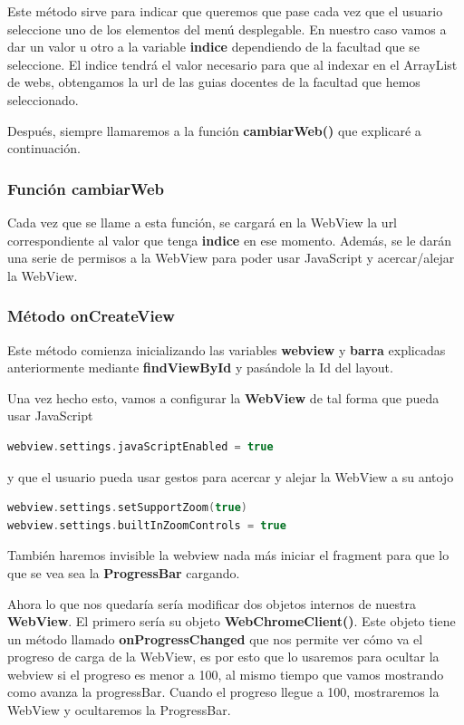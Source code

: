 Este método sirve para indicar que queremos que pase cada vez que el usuario seleccione uno de los elementos del menú desplegable. En nuestro caso vamos a dar un valor u otro a la variable \textbf{indice} dependiendo de la facultad que se seleccione. El indice tendrá el valor necesario para que al indexar en el ArrayList de webs, obtengamos la url de las guias docentes de la facultad que hemos seleccionado.

Después, siempre llamaremos a la función \textbf{cambiarWeb()} que explicaré a continuación.

\subsubsection{Función cambiarWeb}

Cada vez que se llame a esta función, se cargará en la WebView la url correspondiente al valor que tenga \textbf{indice} en ese momento.
Además, se le darán una serie de permisos a la WebView para poder usar JavaScript y acercar/alejar la WebView.

\subsubsection{Método onCreateView}

Este método comienza inicializando las variables \textbf{webview} y \textbf{barra} explicadas anteriormente mediante \textbf{findViewById} y pasándole la Id del layout.

Una vez hecho esto, vamos a configurar la \textbf{WebView} de tal forma que pueda usar JavaScript

\begin{lstlisting}[language=Kotlin]
webview.settings.javaScriptEnabled = true
\end{lstlisting}

y que el usuario pueda usar gestos para acercar y alejar la WebView a su antojo

\begin{lstlisting}[language=Kotlin]
webview.settings.setSupportZoom(true)
webview.settings.builtInZoomControls = true
\end{lstlisting}

También haremos invisible la webview nada más iniciar el fragment para que lo que se vea sea la \textbf{ProgressBar} cargando.

Ahora lo que nos quedaría sería modificar dos objetos internos de nuestra \textbf{WebView}. El primero sería su objeto \textbf{WebChromeClient()}. Este objeto tiene un método llamado \textbf{onProgressChanged} que nos permite ver cómo va el progreso de carga de la WebView, es por esto que lo usaremos para ocultar la webview si el progreso es menor a 100, al mismo tiempo que vamos mostrando como avanza la progressBar. Cuando el progreso llegue a 100, mostraremos la WebView y ocultaremos la ProgressBar.

